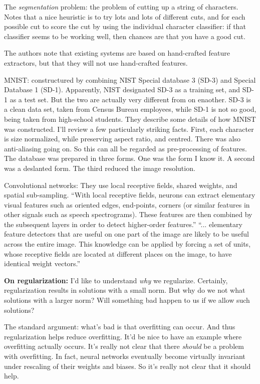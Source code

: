 \documentclass[12pt]{article}
\begin{document}
The \emph{segmentation} problem: the problem of cutting up a string of
characters.  Notes that a nice heuristic is to try lots and lots of
different cuts, and for each possible cut to score the cut by using
the individual character classifier: if that classifier seems to be
working well, then chances are that you have a good cut.

The authors note that existing systems are based on hand-crafted
feature extractors, but that they will not use hand-crafted features.

MNIST: constructured by combining NIST Special database 3 (SD-3) and
Special Database 1 (SD-1).  Apparently, NIST designated SD-3 as a
training set, and SD-1 as a test set.  But the two are actually very
different from on enaother.  SD-3 is a clean data set, taken from
Census Bureau employees, while SD-1 is not so good, being taken from
high-school students.  They describe some details of how MNIST was
constructed.  I'll review a few particularly striking facts.  First,
each character is size normalized, while preserving aspect ratio, and
centred.  There was also anti-aliasing going on.  So this can all be
regarded as pre-processing of features.  The database was prepared in
three forms.  One was the form I know it.  A second was a deslanted
form.  The third reduced the image resolution.

Convolutional networks: They use local receptive fields, shared
weights, and spatial sub-sampling.  ``With local receptive fields,
neurons can extract elementary visual features such as oriented edges,
end-points, corners (or similar features in other signals such as
speech spectrograms).  These features are then combined by the
subsequent layers in order to detect higher-order features.''
``... elementary feature detectors that are useful on one part of the
image are likely to be useful across the entire image.  This knowledge
can be applied by forcing a set of units, whose receptive fields are
located at different places on the image, to have identical weight
vectors.''

\textbf{On regularization:} I'd like to understand \emph{why} we
regularize.  Certainly, regularization results in solutions with a
small norm.  But why do we not what solutions with a larger norm?
Will something bad happen to us if we allow such solutions?

The standard argument: what's bad is that overfitting can occur.  And
thus regularization helps reduce overfitting.  It'd be nice to have an
example where overfitting actually occurs.  It's really not clear that
there \emph{should} be a problem with overfitting.  In fact, neural
networks eventually become virtually invariant under rescaling of
their weights and biases.  So it's really not clear that it should
help.
\end{document}
